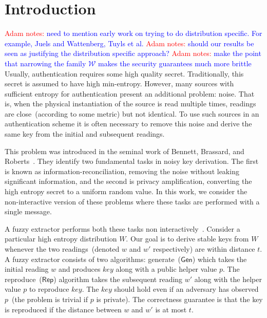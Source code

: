 \documentclass[11pt]{article}
\newcommand{\class}[1]{{\ensuremath{\mathsf{#1}}}}
\newcommand{\gen}{\ensuremath{\class{Gen}}\xspace}
\newcommand{\rep}{\ensuremath{\class{Rep}}\xspace}
\newcommand{\authnote}[2]{{\textcolor{red}{\textsf{#1 notes: }\textcolor{blue}{ #2}}\marginpar{\textcolor{red}{\textbf{!!!!!}}}}}
\newcommand{\authnote}[2]{}
\newcommand{\anote}[1]{{\authnote{Adam}{#1}}}
\begin{document}
\section{Introduction}
\anote{need to mention early work on trying to do distribution specific. For example, Juels and Wattenberg, Tuyls et al.}
\anote{should our results be seen as justifying the distribution specific approach?}
\anote{make the point that narrowing the family $\mathcal{W}$ makes the security guarantees much more brittle}
Usually, authentication requires some high quality secret.  Traditionally, this secret is assumed to have high min-entropy.  However, many sources with sufficient entropy for authentication present an additional problem: noise.  That is, when the physical instantiation of the source is read multiple times, readings are close~(according to some metric) but not identical.  To use such sources in an authentication scheme it is often necessary to remove this noise and derive the same key from the initial and subsequent readings.

This problem was introduced in the seminal work of Bennett, Brassard, and Roberts~\cite{bennett1988privacy}.  They identify two fundamental tasks in noisy key derivation.  The first is known as information-reconciliation, removing the noise without leaking significant information, and the second is privacy amplification, converting the high entropy secret to a uniform random value.  In this work, we consider the non-interactive version of these problems where these tasks are performed with a single message.

A fuzzy extractor performs both these tasks non interactively~\cite{DBLP:journals/siamcomp/DodisORS08}.  Consider a particular high entropy distribution $W$.  Our goal is to derive stable keys from $W$ whenever the two readings~(denoted $w$ and $w'$ respectively) are within distance $t$.  
A fuzzy extractor consists of two algorithms: generate~($\gen$) which takes the initial reading $w$ and produces $key$ along with a public helper value $p$.  The reproduce~($\rep$) algorithm takes the subsequent reading $w'$ along with the helper value $p$ to reproduce $key$.  The $key$ should hold even if an adversary has observed $p$~(the problem is trivial if $p$ is private).  The correctness guarantee is that the key is reproduced if the distance between $w$ and $w'$ is at most $t$.
\end{document}
